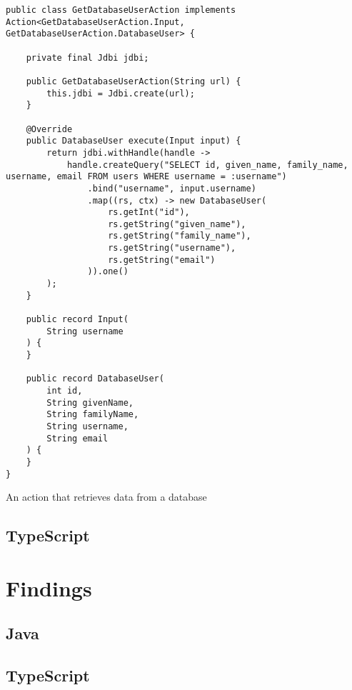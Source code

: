 \begin{listing}[H]
\begin{verbatim}
public class GetDatabaseUserAction implements Action<GetDatabaseUserAction.Input, GetDatabaseUserAction.DatabaseUser> {
    
    private final Jdbi jdbi;
    
    public GetDatabaseUserAction(String url) {
        this.jdbi = Jdbi.create(url);
    }
    
    @Override
    public DatabaseUser execute(Input input) {
        return jdbi.withHandle(handle ->
            handle.createQuery("SELECT id, given_name, family_name, username, email FROM users WHERE username = :username")
                .bind("username", input.username)
                .map((rs, ctx) -> new DatabaseUser(
                    rs.getInt("id"),
                    rs.getString("given_name"),
                    rs.getString("family_name"),
                    rs.getString("username"),
                    rs.getString("email")
                )).one()
        );
    }
    
    public record Input(
        String username
    ) {
    }
    
    public record DatabaseUser(
        int id,
        String givenName,
        String familyName,
        String username,
        String email
    ) {
    }
}
\end{verbatim}
\caption{An action that retrieves data from a database}
\end{listing}

\subsection{TypeScript}

\section{Findings}
\subsection{Java}
\subsection{TypeScript}
